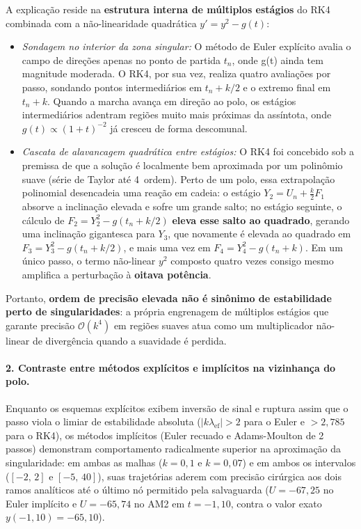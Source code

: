 \documentclass[12pt, a4paper]{article}
\begin{document}
A explicação reside na \textbf{estrutura interna de múltiplos estágios} do RK4 combinada com a não-linearidade quadrática $y' = y^2 - g(t)$:
\begin{itemize}
    \item \emph{Sondagem no interior da zona singular:} O método de Euler explícito avalia o campo de direções apenas no ponto de partida $t_n$, onde g(t) ainda tem magnitude moderada. O RK4, por sua vez, realiza quatro avaliações por passo, sondando pontos intermediários em $t_n + k/2$ e o extremo final em $t_n + k$. Quando a marcha avança em direção ao polo, os estágios intermediários adentram regiões muito mais próximas da assíntota, onde $g(t) \propto (1+t)^{-2}$ já cresceu de forma descomunal.
    \item \emph{Cascata de alavancagem quadrática entre estágios:} O RK4 foi concebido sob a premissa de que a solução é localmente bem aproximada por um polinômio suave (série de Taylor até 4\textordfeminine~ordem). Perto de um polo, essa extrapolação polinomial desencadeia uma reação em cadeia: o estágio $Y_2 = U_n + \frac{k}{2}F_1$ absorve a inclinação elevada e sofre um grande salto; no estágio seguinte, o cálculo de $F_2 = Y_2^2 - g(t_n + k/2)$ \textbf{eleva esse salto ao quadrado}, gerando uma inclinação gigantesca para $Y_3$, que novamente é elevada ao quadrado em $F_3 = Y_3^2 - g(t_n + k/2)$, e mais uma vez em $F_4 = Y_4^2 - g(t_n + k)$. Em um único passo, o termo não-linear $y^2$ composto quatro vezes consigo mesmo amplifica a perturbação à \textbf{oitava potência}. 
\end{itemize}
Portanto, \textbf{ordem de precisão elevada não é sinônimo de estabilidade perto de singularidades}: a própria engrenagem de múltiplos estágios que garante precisão $\mathcal{O}(k^4)$ em regiões suaves atua como um multiplicador não-linear de divergência quando a suavidade é perdida.

\paragraph{2. Contraste entre métodos explícitos e implícitos na vizinhança do polo.}
Enquanto os esquemas explícitos exibem inversão de sinal e ruptura assim que o passo viola o limiar de estabilidade absoluta ($|k\lambda_{\mathrm{ef}}| > 2$ para o Euler e $> 2{,}785$ para o RK4), os métodos implícitos (Euler recuado e Adams-Moulton de 2 passos) demonstram comportamento radicalmente superior na aproximação da singularidade: em ambas as malhas ($k = 0{,}1$ e $k = 0{,}07$) e em ambos os intervalos ($[-2,\, 2]$ e $[-5,\, 40]$), suas trajetórias aderem com precisão cirúrgica aos dois ramos analíticos até o último nó permitido pela salvaguarda ($U = -67{,}25$ no Euler implícito e $U = -65{,}74$ no AM2 em $t = -1{,}10$, contra o valor exato $y(-1{,}10) = -65{,}10$).
\end{document}
